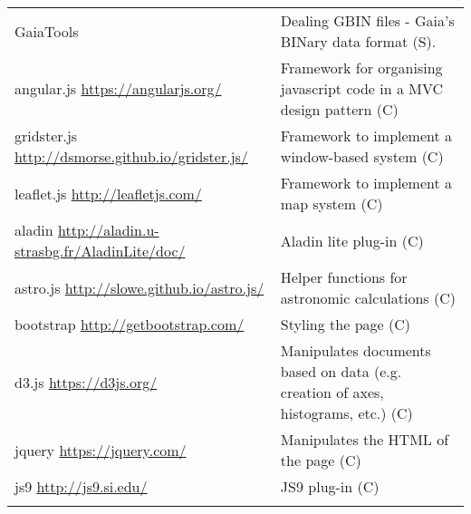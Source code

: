 \documentclass[longauth, final]{aa}
\begin{document}
\begin{table*}[ht]
\begin{tabularx}{0.95\textwidth}{XX}
GaiaTools \newline & Dealing GBIN files - Gaia's BINary data format (S).\\    
	\noalign{\smallskip}%

angular.js \newline \small{\url{https://angularjs.org/}} & Framework for organising  javascript code in a MVC design pattern (C)\\    
    \noalign{\smallskip}%

gridster.js \newline \small{\url{http://dsmorse.github.io/gridster.js/}} & Framework to implement a window-based system (C)\\    
    \noalign{\smallskip}%

leaflet.js \newline \small{\url{http://leafletjs.com/}} & Framework to implement a map system (C)\\
    \noalign{\smallskip}%

aladin \newline \small{\url{http://aladin.u-strasbg.fr/AladinLite/doc/}} & Aladin lite plug-in (C)\\    
    \noalign{\smallskip}%

astro.js \newline \small{\url{http://slowe.github.io/astro.js/}} & Helper functions for astronomic calculations (C)\\    
    \noalign{\smallskip}%

bootstrap \newline \small{\url{http://getbootstrap.com/}} & Styling the page (C)\\
    \noalign{\smallskip}%

d3.js \newline \small{\url{https://d3js.org/}} & Manipulates documents based on data (e.g. creation of axes, histograms, etc.) (C)\\
    \noalign{\smallskip}%

jquery \newline \small{\url{https://jquery.com/}} & Manipulates the HTML of the page (C)\\    
    \noalign{\smallskip}%

js9 \newline \small{\url{http://js9.si.edu/}} & JS9 plug-in (C)\\    
    \noalign{\smallskip}%


\end{tabularx}
\end{table*}
\end{document}
